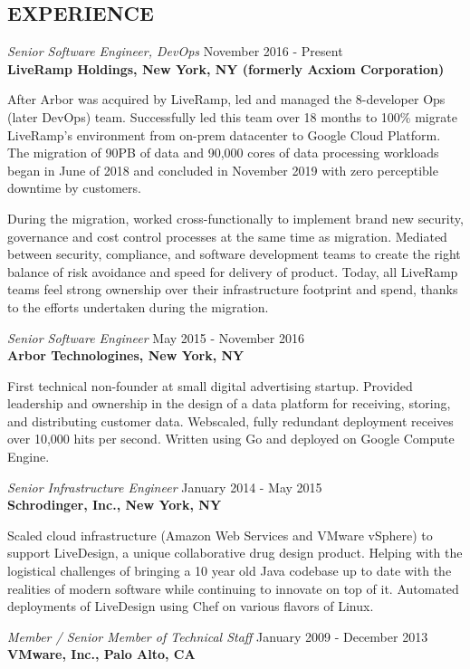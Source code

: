\documentclass[overlapped,line,margin]{res}
\begin{document}
\begin{resume}
\section{EXPERIENCE}
{\sl Senior Software Engineer, DevOps} \hfill November 2016 - Present \\
\textbf{LiveRamp Holdings, New York, NY (formerly Acxiom Corporation)}

  After Arbor was acquired by LiveRamp, led and managed the 8-developer
  Ops (later DevOps) team. Successfully led this team over 18 months to
  100\% migrate LiveRamp's environment from on-prem datacenter to Google
  Cloud Platform. The migration of 90PB of data and 90,000 cores of data
  processing workloads began in June of 2018 and concluded in November
  2019 with zero perceptible downtime by customers.

  During the migration, worked cross-functionally to implement brand new
  security, governance and cost control processes at the same time as
  migration.  Mediated between security, compliance, and software
  development teams to create the right balance of risk avoidance and
  speed for delivery of product. Today, all LiveRamp teams feel strong
  ownership over their infrastructure footprint and spend, thanks to the
  efforts undertaken during the migration.

{\sl Senior Software Engineer} \hfill May 2015 - November 2016 \\
\textbf{Arbor Technologines, New York, NY}

  First technical non-founder at small digital advertising startup.
  Provided leadership and ownership in the design of a data platform
  for receiving, storing, and distributing customer data. Webscaled,
  fully redundant deployment receives over 10,000 hits per second.
  Written using Go and deployed on Google Compute Engine.

{\sl Senior Infrastructure Engineer} \hfill January 2014 - May 2015 \\
\textbf{Schrodinger, Inc., New York, NY}

  Scaled cloud infrastructure (Amazon Web Services and VMware vSphere) to
  support LiveDesign, a unique collaborative drug design product. Helping with
  the logistical challenges of bringing a 10 year old Java codebase up to date
  with the realities of modern software while continuing to innovate on top of
  it. Automated deployments of LiveDesign using Chef on various flavors of
  Linux.

{\sl Member / Senior Member of Technical Staff} \hfill January 2009 - December 2013 \\
\textbf{VMware, Inc., Palo Alto, CA}


\end{resume}
\end{document}
